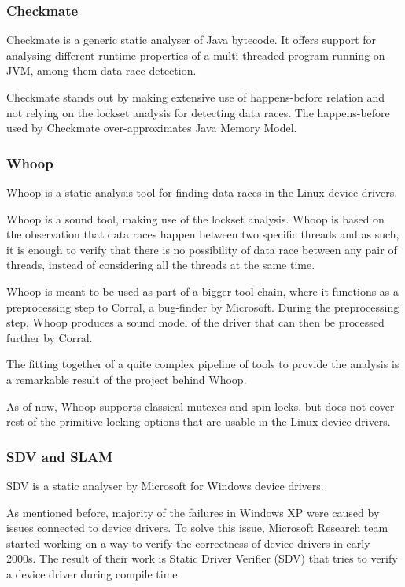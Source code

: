 \documentclass[..thesis.tex]{subfiles}
\begin{document}
\subsubsection{Checkmate}

Checkmate\cite{ferrara_checkmate:_2009} is a generic static analyser of Java bytecode.
It offers support for analysing different runtime properties of a multi-threaded program running on JVM, among them data race detection.

Checkmate stands out by making extensive use of happens-before relation and not relying on the lockset analysis for detecting data races.
The happens-before used by Checkmate over-approximates Java Memory Model.

\subsubsection{Whoop}

Whoop\cite{deligiannis_fast_2015} is a static analysis tool for finding data races in the Linux device drivers. 

Whoop is a sound tool, making use of the lockset analysis. Whoop is based on the observation that data races happen between two specific threads and as such,
it is enough to verify that there is no possibility of data race between any pair of threads, instead of considering all the threads at the same time.

Whoop is meant to be used as part of a bigger tool-chain, where it functions as a preprocessing step to Corral, a bug-finder by Microsoft. During the preprocessing step,
Whoop produces a sound model of the driver that can then be processed further by Corral.

The fitting together of a quite complex pipeline of tools to provide the analysis is a remarkable result of the project behind Whoop.

As of now, Whoop supports classical mutexes and spin-locks, but does not cover rest of the primitive locking options that are usable in the Linux device drivers. 

\subsubsection{SDV and SLAM}

SDV is a static analyser by Microsoft for Windows device drivers.

As mentioned before, majority of the failures in Windows XP were caused by issues connected to device drivers. To solve this issue,
Microsoft Research team started working on a way to verify the correctness of device drivers in early 2000s.
The result of their work is Static Driver Verifier (SDV) that tries to verify a device driver during compile time. 
\end{document}
